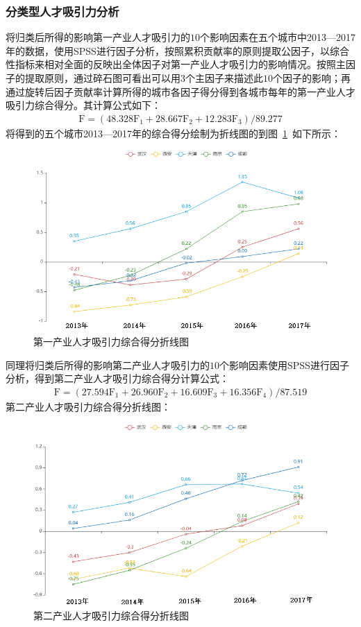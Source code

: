 \documentclass{whutmod}
\begin{document}
	\subsubsection{分类型人才吸引力分析}
	将归类后所得的影响第一产业人才吸引力的$10$个影响因素在五个城市中2013—2017年的数据，使用SPSS进行因子分析，按照累积贡献率的原则提取公因子，以综合性指标来相对全面的反映出全体因子对第一产业人才吸引力的影响情况。按照主因子的提取原则，通过碎石图可看出可以用$3$个主因子来描述此$10$个因子的影响；再通过旋转后因子贡献率计算所得的城市各因子得分得到各城市每年的第一产业人才吸引力综合得分。其计算公式如下：
	\begin{gather}
	\mathrm { F } = \left( 48.328 \mathrm { F } _ { 1 } + 28.667 \mathrm { F } _ { 2 } + 12.283 \mathrm { F } _ { 3 } \right) / 89.277
	\end{gather}
	将得到的五个城市2013—2017年的综合得分绘制为折线图的到图~\ref{11}~如下所示：
	\begin{figure}[H]
		\centering
		\includegraphics[width=.9\textwidth]{figures/11.png}
		\caption{第一产业人才吸引力综合得分折线图}\label{11}
	\end{figure} 
	同理将归类后所得的影响第二产业人才吸引力的$10$个影响因素使用SPSS进行因子分析，得到第二产业人才吸引力综合得分计算公式：
	\begin{gather}
	\mathrm { F } = \left( 27.594 \mathrm { F } _ { 1 } + 26.960 \mathrm { F } _ { 2 } + 16.609 \mathrm { F } _ { 3 } + 16.356 \mathrm { F } _ { 4 } \right) / 87.519
	\end{gather}
	第二产业人才吸引力综合得分折线图：
	\begin{figure}[H]
		\centering
		\includegraphics[width=.9\textwidth]{figures/22.png}
		\caption{第二产业人才吸引力综合得分折线图}\label{22}
	\end{figure}
	
\end{document}
